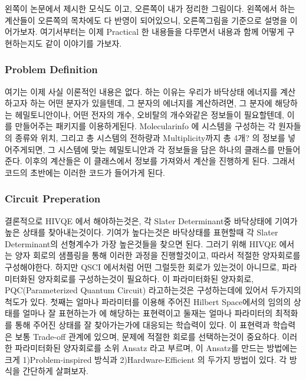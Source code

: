 \documentclass[10pt]{article}
\begin{document}
왼쪽이 논문에서 제시한 모식도 이고, 오른쪽이 내가 정리한 그림이다. 
왼쪽에서 하는 계산들이 오른쪽의 목차에도 다 반영이 되어있으니, 오른쪽그림을 기준으로 설명을 이어가보자. 
여기서부터는 이제 Practical 한 내용들을 다루면서 내용과 함께 어떻게 구현하는지도 같이 이야기를 가보자. 

\subsubsection{Problem Definition}
여기는 이제 사실 이론적인 내용은 없다. 
하는 이유는 우리가 바닥상태 에너지를 계산하고자 하는 어떤 분자가 있을텐데, 그 분자의 에너지를 계산하려면, 
그 분자에 해당하는 헤밀토니안이나, 어떤 전자의 개수, 오비탈의 개수와같은 정보들이 필요할텐데, 이를 만들어주는 패키지를 이용하게된다. 
Molecularinfo 에 시스템을 구성하는 각 원자들의 종류와 위치, 그리고 총 시스템의 전하량과 Multiplicity까지 총 4개? 의 정보를 넣어주게되면,
그 시스템에 맞는 헤밀토니안과 각 정보들을 담은 하나의 클래스를 만들어준다. 이후의 계산들은 이 클래스에서 정보를 가져와서 계산을 진행하게 된다. 
그래서 코드의 초반에는 이러한 코드가 들어가게 된다. 

\subsubsection{Circuit Preperation}
결론적으로 HIVQE 에서 해야하는것은, 각 Slater Determinant중 바닥상태에 기여가 높은 상태를 찾아내는것이다. 
기여가 높다는것은 바닥상태를 표현할때 각 Slater Determinant의 선형계수가 가장 높은것들을 찾으면 된다. 
그러기 위해 HIVQE 에서는 양자 회로의 샘플링을 통해 이러한 과정을 진행할것이고, 따라서 적절한 양자회로를 구성해야한다. 
하지만 QSCI 에서처럼 어떤 그럴듯한 회로가 있는것이 아니므로, 파라미터화된 양자회로를 구성하는것이 필요하다. 
이 파라미터화된 양자회로, PQC(Parameterized Quantum Circuit) 라고하는것은 구성하는데에 있어서 두가지의 척도가 있다. 
첫째는 얼마나 파라미터를 이용해 주어진 Hilbert Space에서의 임의의 상태를 얼마나 잘 표현하는가 에 해당하는 표현력이고
둘재는 얼마나 파라미터의 최적화를 통해 주어진 상태를 잘 찾아가는가에 대응되는 학습력이 있다. 
이 표현력과 학습력은 보통 Trade-off 관계에 있으며, 문제에 적절한 회로를 선택하는것이 중요하다. 
이러한 파라미터화된 양자회로를 소위 Ansatz 라고 부르며, 이 Ansatz를 만드는 방법에는 크게  1)Problem-inspired 방식과 2)Hardware-Efficient 의 두가지 방법이 있다. 
각 방식을 간단하게 살펴보자. 
\end{document}
